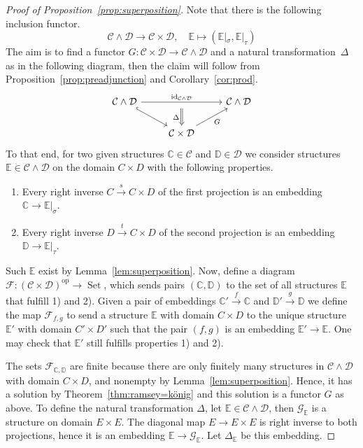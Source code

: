 \documentclass[preprint,12pt]{elsarticle}
\newcommand{\cat}[1]{\mathcal{#1}}
\newcommand{\str}[1]{\mathbb{#1}}
\newcommand{\op}{^{\mathop{op}}}
\DeclareMathOperator{\Set}{Set}
\DeclareMathOperator{\id}{id}
\begin{document}
\begin{proof}[Proof of Proposition~\ref{prop:superposition}]
Note that there is the following inclusion functor. 
$$
\cat C\wedge \cat D\to \cat C\times \cat D, \quad\str E\mapsto(\str E|_\sigma, \str E|_\tau)$$
The aim is to find a functor $G:\cat C\times \cat D\to \cat C\wedge \cat D$ and a natural transformation~$\Delta$ as in the following diagram, then the claim will follow from Proposition~\ref{prop:preadjunction} and Corollary~\ref{cor:prod}.
$$
\begin{tikzcd}
\cat C\wedge \cat D \arrow[rd, hook] \arrow[rr, "\id_{\cat C\wedge \cat D}"] & {} \arrow[d, "\Delta"', Rightarrow] & \cat C\wedge \cat D\\
& \cat C\times \cat D \arrow[ru, "G"']     &    
\end{tikzcd}
$$
To that end, for two given structures $\str C\in \cat C$ and $\str D\in \cat D$ we consider structures $\str E\in \cat C\wedge\cat D$ on the domain $C\times D$ with the following properties.
\begin{enumerate}
    \item Every right inverse $C\xrightarrow{s}C\times D$  of the  first projection is an embedding $\str C\to\str E|_\sigma$. 
    \item Every right inverse $D\xrightarrow{t}C\times D$ of the second projection is an embedding $\str D\to\str E|_\tau$.
\end{enumerate}
Such $\str E$ exist by Lemma~\ref{lem:superposition}.
Now, define a diagram $\cat F:(\cat C\times \cat D)\op\to\Set$, which sends pairs $(\str C,\str D)$ to the set of all structures $\str E$ that fulfill 1) and 2). Given a pair of embeddings $\str C'\xrightarrow{f}\str C$ and $\str D'\xrightarrow{g} \str D$ we define the map $\cat F_{f,g}$ to send a structure $\str E$ with domain $C\times D$ to the unique structure $\str E'$ with domain $C'\times D'$ such that the pair $(f,g)$ is an embedding $\str E'\to \str E$. One may check that $\str E'$ still fulfills properties 1) and 2).


The sets $\cat F_{\str C,\str D}$ are finite because there are only finitely many structures in $\cat C\wedge\cat D$ with domain $C\times D$, and nonempty by Lemma~\ref{lem:superposition}. Hence, it has a solution by Theorem~\ref{thm:ramsey=könig} and this solution is a functor $G$ as above. To define the natural transformation $\Delta$, let $\str E\in\cat C\wedge\cat D$, then $\cat G_{\str E}$ is a structure on domain $E\times E$. The diagonal map $E\to E\times E$ is right inverse to both projections, hence it is an embedding $\str E\to \cat G_{\str E}$. Let $\Delta_{\str E}$ be this embedding.
\end{proof}
\end{document}
